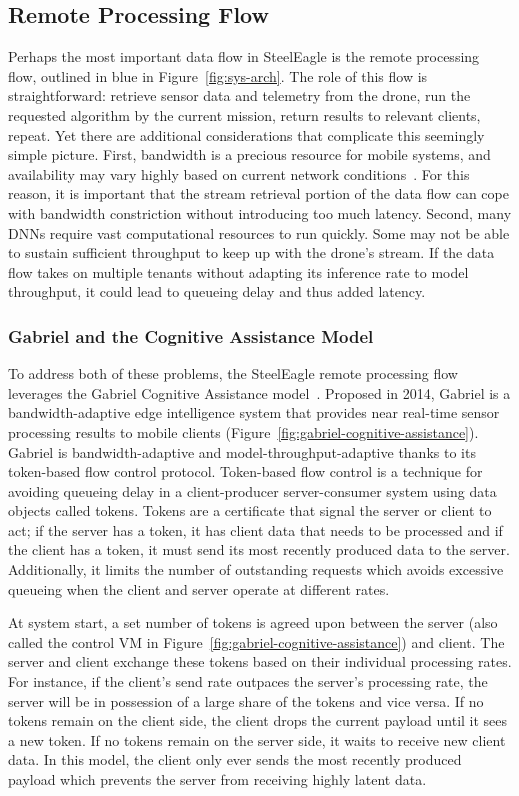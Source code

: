 \subsection{Remote Processing Flow}
Perhaps the most important data flow in SteelEagle is the remote processing flow, outlined in blue in Figure~\ref{fig:sys-arch}. The role of this flow is straightforward: retrieve sensor data and telemetry from the drone, run the requested algorithm by the current mission, return results to relevant clients, repeat. Yet there are additional considerations that complicate this seemingly simple picture. First, bandwidth is a precious resource for mobile systems, and availability may vary highly based on current network conditions~\cite{Forman1994}. For this reason, it is important that the stream retrieval portion of the data flow can cope with bandwidth constriction without introducing too much latency. Second, many DNNs require vast computational resources to run quickly. Some may not be able to sustain sufficient throughput to keep up with the drone's stream. If the data flow takes on multiple tenants without adapting its inference rate to model throughput, it could lead to queueing delay and thus added latency.

\subsubsection{Gabriel and the Cognitive Assistance Model}
To address both of these problems, the SteelEagle remote processing flow leverages the Gabriel Cognitive Assistance model~\cite{Ha2014}. Proposed in 2014, Gabriel is a bandwidth-adaptive edge intelligence system that provides near real-time sensor processing results to mobile clients (Figure~\ref{fig:gabriel-cognitive-assistance}). Gabriel is bandwidth-adaptive and model-throughput-adaptive thanks to its token-based flow control protocol. Token-based flow control is a technique for avoiding queueing delay in a client-producer server-consumer system using data objects called tokens. Tokens are a certificate that signal the server or client to act; if the server has a token, it has client data that needs to be processed and if the client has a token, it must send its most recently produced data to the server. Additionally, it limits the number of outstanding requests which avoids excessive queueing when the client and server operate at different rates.

At system start, a set number of tokens is agreed upon between the server (also called the control VM in Figure~\ref{fig:gabriel-cognitive-assistance}) and client. The server and client exchange these tokens based on their individual processing rates. For instance, if the client's send rate outpaces the server's processing rate, the server will be in possession of a large share of the tokens and vice versa. If no tokens remain on the client side, the client drops the current payload until it sees a new token. If no tokens remain on the server side, it waits to receive new client data. In this model, the client only ever sends the most recently produced payload which prevents the server from receiving highly latent data.


